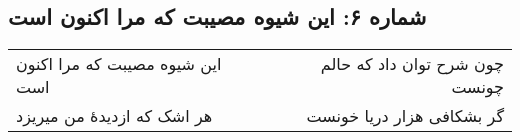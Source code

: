 \begin{center}
\section*{شماره ۶: این شیوه مصیبت که مرا اکنون است}
\label{sec:006}
\begin{longtable}{l p{0.5cm} r}
این شیوه مصیبت که مرا اکنون است
&&
چون شرح توان داد که حالم چونست
\\
هر اشک که ازدیدهٔ من میریزد
&&
گر بشکافی هزار دریا خونست
\\
\end{longtable}
\end{center}
